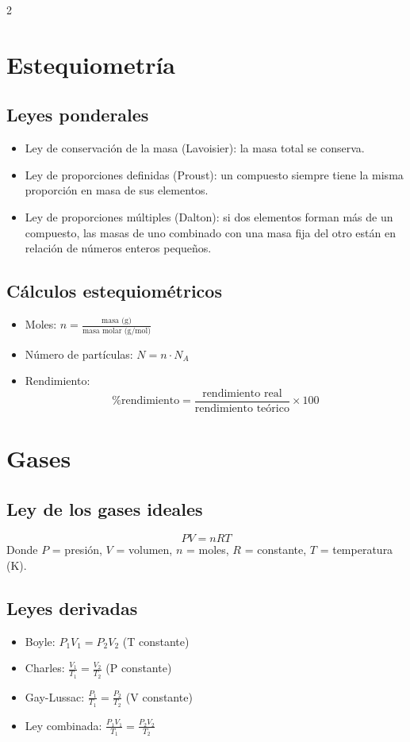 \documentclass[12pt]{article}
\begin{document}
\begin{multicols}{2}
\section*{Estequiometría}
\subsection*{Leyes ponderales}
\begin{itemize}[leftmargin=*]
    \item Ley de conservación de la masa (Lavoisier): la masa total se conserva.
    \item Ley de proporciones definidas (Proust): un compuesto siempre tiene la misma proporción en masa de sus elementos.
    \item Ley de proporciones múltiples (Dalton): si dos elementos forman más de un compuesto, las masas de uno combinado con una masa fija del otro están en relación de números enteros pequeños.
\end{itemize}

\subsection*{Cálculos estequiométricos}
\begin{itemize}[leftmargin=*]
    \item Moles: $n = \frac{\text{masa (g)}}{\text{masa molar (g/mol)}}$
    \item Número de partículas: $N = n \cdot N_A$
    \item Rendimiento: 
    \[
    \% \text{rendimiento} = \frac{\text{rendimiento real}}{\text{rendimiento teórico}} \times 100
    \]
\end{itemize}

\section*{Gases}
\subsection*{Ley de los gases ideales}
\[
PV = nRT
\]
Donde $P$ = presión, $V$ = volumen, $n$ = moles, $R$ = constante, $T$ = temperatura (K).

\subsection*{Leyes derivadas}
\begin{itemize}[leftmargin=*]
    \item Boyle: $P_1V_1 = P_2V_2$ (T constante)
    \item Charles: $\frac{V_1}{T_1} = \frac{V_2}{T_2}$ (P constante)
    \item Gay-Lussac: $\frac{P_1}{T_1} = \frac{P_2}{T_2}$ (V constante)
    \item Ley combinada: $\frac{P_1V_1}{T_1} = \frac{P_2V_2}{T_2}$
\end{itemize}


\end{multicols}
\end{document}
